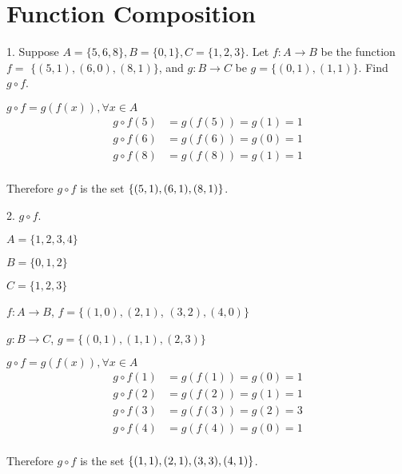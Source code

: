 \documentclass{article}
\begin{document}
\section{Function Composition}

\begin{exercise}{}{}
	{1. Suppose $A=\{5,6,8\}, B=\{0,1\}, C=\{1,2,3\}$. Let $f: A
			\rightarrow B$ be the function $f=$ $\{(5,1),(6,0),(8,1)\}$, and $g: B
			\rightarrow C$ be $g=\{(0,1),(1,1)\}$. Find $g \circ f$.}
	\begin{alist}
		\item $g \circ f = g(f(x)), \forall x\in A$
		\begin{align*}
			g \circ f(5) & = g(f(5)) = g(1) = 1 \\
			g \circ f(6) & = g(f(6)) =g(0) = 1  \\
			g \circ f(8) & = g(f(8)) =g(1) = 1  \\
		\end{align*}
		\item Therefore $g\circ f$ is the set $\{(5, 1), (6, 1), (8, 1)\}$.
	\end{alist}
\end{exercise}{}{}

\begin{exercise}{}{}
	{2. $g \circ f$.}
	\begin{alist}
		\item $A=\{1,2,3,4\}$
		\item $B=\{0,1,2\}$
		\item $C=\{1,2,3\}$
		\item $f: A \rightarrow B$, $f=\{(1,0),(2,1)$, $(3,2),(4,0)\}$
		\item $g: B \rightarrow C$, $g=\{(0,1),(1,1),(2,3)\}$
		\item $g \circ f = g(f(x)), \forall x\in A$
		\begin{align*}
			g \circ f(1) & = g(f(1)) = g(0) = 1 \\
			g \circ f(2) & = g(f(2)) = g(1) = 1 \\
			g \circ f(3) & = g(f(3)) = g(2) = 3 \\
			g \circ f(4) & = g(f(4)) = g(0) = 1 \\
		\end{align*}
		\item Therefore $g\circ f$ is the set $\{(1, 1), (2, 1), (3, 3), (4, 1)\}$.
	\end{alist}
\end{exercise}{}{}
\end{document}
